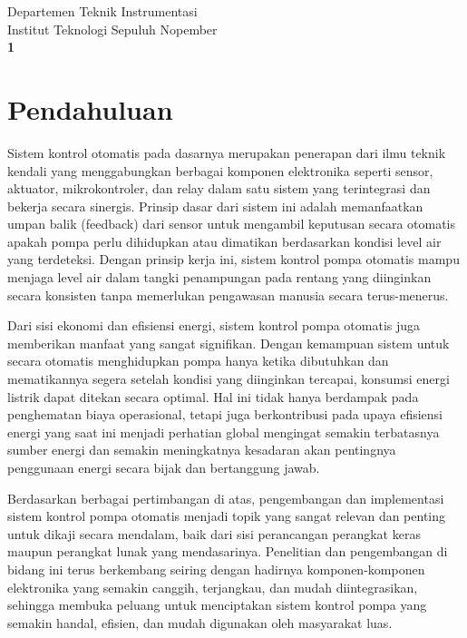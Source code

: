 \documentclass[12pt,a4paper]{article}
\begin{document}
\begin{titlepage}
    \vfill
    
    {\large Departemen Teknik Instrumentasi} \\[0.1cm]
    {\large Institut Teknologi Sepuluh Nopember} \\[1cm]
    
    \textbf{1} 
\end{titlepage}

\newpage
\tableofcontents
\newpage


\section{Pendahuluan}
Sistem kontrol otomatis pada dasarnya merupakan penerapan dari ilmu teknik kendali yang menggabungkan berbagai komponen elektronika seperti sensor, aktuator, mikrokontroler, dan relay dalam satu sistem yang terintegrasi dan bekerja secara sinergis. Prinsip dasar dari sistem ini adalah memanfaatkan umpan balik (feedback) dari sensor untuk mengambil keputusan secara otomatis apakah pompa perlu dihidupkan atau dimatikan berdasarkan kondisi level air yang terdeteksi. Dengan prinsip kerja ini, sistem kontrol pompa otomatis mampu menjaga level air dalam tangki penampungan pada rentang yang diinginkan secara konsisten tanpa memerlukan pengawasan manusia secara terus-menerus.

Dari sisi ekonomi dan efisiensi energi, sistem kontrol pompa otomatis juga memberikan manfaat yang sangat signifikan. Dengan kemampuan sistem untuk secara otomatis menghidupkan pompa hanya ketika dibutuhkan dan mematikannya segera setelah kondisi yang diinginkan tercapai, konsumsi energi listrik dapat ditekan secara optimal. Hal ini tidak hanya berdampak pada penghematan biaya operasional, tetapi juga berkontribusi pada upaya efisiensi energi yang saat ini menjadi perhatian global mengingat semakin terbatasnya sumber energi dan semakin meningkatnya kesadaran akan pentingnya penggunaan energi secara bijak dan bertanggung jawab.

Berdasarkan berbagai pertimbangan di atas, pengembangan dan implementasi sistem kontrol pompa otomatis menjadi topik yang sangat relevan dan penting untuk dikaji secara mendalam, baik dari sisi perancangan perangkat keras maupun perangkat lunak yang mendasarinya. Penelitian dan pengembangan di bidang ini terus berkembang seiring dengan hadirnya komponen-komponen elektronika yang semakin canggih, terjangkau, dan mudah diintegrasikan, sehingga membuka peluang untuk menciptakan sistem kontrol pompa yang semakin handal, efisien, dan mudah digunakan oleh masyarakat luas.
\end{document}
